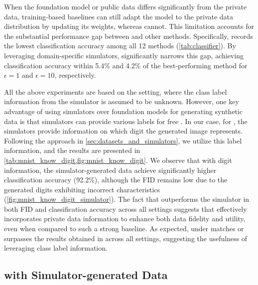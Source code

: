 When the foundation model or public data differs significantly from the private data, training-based baselines can still adapt the model to the private data distribution by updating its weights, whereas \pe{} cannot. This limitation accounts for the substantial performance gap between \pe{} and other methods. Specifically, \pe{} records the lowest classification accuracy among all 12 methods (\cref{tab:classifier}). By leveraging domain-specific simulators, \simpe{} significantly narrows this gap, achieving classification accuracy within 5.4\% and 4.2\% of the best-performing method for $\epsilon=1$ and $\epsilon=10$, respectively.


 All the above experiments are based on the \classunavail{} setting, where the class label information from the simulator is assumed to be unknown. However, one key advantage of using simulators over foundation models for generating synthetic data is that simulators can provide various labels for free \cite{wood2021fake,bae2023digiface}. In our case, for \mnist{}, the simulators provide information on which digit the generated image represents.
Following the approach in \cref{sec:datasets_and_simulators}, we utilize this label information, and the results are presented in \cref{tab:mnist_know_digit,fig:mnist_know_digit}. We observe that with digit information, the simulator-generated data achieve significantly higher classification accuracy (92.2\%), although the FID remains low due to the generated digits exhibiting incorrect characteristics (\cref{fig:mnist_know_digit_simulator}). The fact that \simpe{} outperforms the simulator in both FID and classification accuracy across all settings suggests that \simpe{} effectively incorporates private data information to enhance both data fidelity and utility, even when compared to such a strong baseline. As expected, \simpe{} under \classavail{} matches or surpasses the results obtained in \classunavail{} across all settings, suggesting the usefulness of  leveraging class label information.







\subsection{\simpe{} with Simulator-generated Data}


